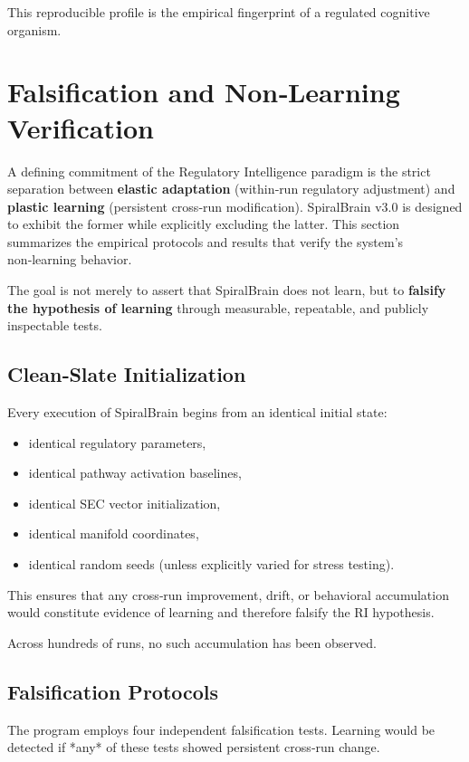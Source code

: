 \documentclass[12pt,a4paper]{report}
\begin{document}
This reproducible profile is the empirical fingerprint of a regulated cognitive organism.

\section{Falsification and Non‑Learning Verification}

A defining commitment of the Regulatory Intelligence paradigm is the strict separation between \textbf{elastic adaptation} (within‑run regulatory adjustment) and \textbf{plastic learning} (persistent cross‑run modification). SpiralBrain v3.0 is designed to exhibit the former while explicitly excluding the latter. This section summarizes the empirical protocols and results that verify the system’s non‑learning behavior.

The goal is not merely to assert that SpiralBrain does not learn, but to \textbf{falsify the hypothesis of learning} through measurable, repeatable, and publicly inspectable tests.

\subsection{Clean‑Slate Initialization}

Every execution of SpiralBrain begins from an identical initial state:

\begin{itemize}
\item identical regulatory parameters,  
\item identical pathway activation baselines,  
\item identical SEC vector initialization,  
\item identical manifold coordinates,  
\item identical random seeds (unless explicitly varied for stress testing).
\end{itemize}

This ensures that any cross‑run improvement, drift, or behavioral accumulation would constitute evidence of learning and therefore falsify the RI hypothesis.

Across hundreds of runs, no such accumulation has been observed.

\subsection{Falsification Protocols}

The program employs four independent falsification tests. Learning would be detected if *any* of these tests showed persistent cross‑run change.
\end{document}
